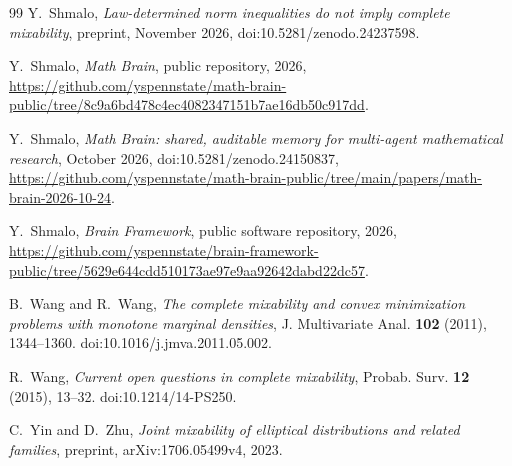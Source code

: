 \documentclass[11pt]{amsart}
\theoremstyle{remark}
\numberwithin{equation}{section}
\begin{document}
\begin{thebibliography}{99}
 Y.~Shmalo, \emph{Law-determined norm inequalities do not imply complete mixability}, preprint, November 2026, doi:10.5281/zenodo.24237598.

 Y.~Shmalo, \emph{Math Brain}, public repository, 2026, \url{https://github.com/yspennstate/math-brain-public/tree/8c9a6bd478c4ec4082347151b7ae16db50c917dd}.

 Y.~Shmalo, \emph{Math Brain: shared, auditable memory for multi-agent mathematical research}, October 2026, doi:10.5281/zenodo.24150837, \url{https://github.com/yspennstate/math-brain-public/tree/main/papers/math-brain-2026-10-24}.

 Y.~Shmalo, \emph{Brain Framework}, public software repository, 2026, \url{https://github.com/yspennstate/brain-framework-public/tree/5629e644cdd510173ae97e9aa92642dabd22dc57}.

 B.~Wang and R.~Wang, \emph{The complete mixability and convex minimization problems with monotone marginal densities}, J. Multivariate Anal. \textbf{102} (2011), 1344--1360. doi:10.1016/j.jmva.2011.05.002.

 R.~Wang, \emph{Current open questions in complete mixability}, Probab. Surv. \textbf{12} (2015), 13--32. doi:10.1214/14-PS250.

 C.~Yin and D.~Zhu, \emph{Joint mixability of elliptical distributions and related families}, preprint, arXiv:1706.05499v4, 2023.

\end{thebibliography}
\end{document}
